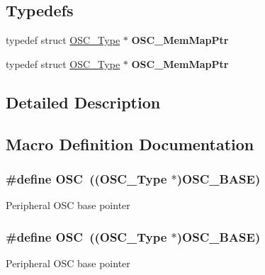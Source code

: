 \subsection*{Typedefs}
\begin{DoxyCompactItemize}
\item 
typedef struct \hyperlink{structOSC__Type}{O\+S\+C\+\_\+\+Type} $\ast$ {\bfseries O\+S\+C\+\_\+\+Mem\+Map\+Ptr}\hypertarget{group__OSC__Peripheral__Access__Layer_ga7c20b064e45e380ca2a66cb8322f4e94}{}\label{group__OSC__Peripheral__Access__Layer_ga7c20b064e45e380ca2a66cb8322f4e94}

\item 
typedef struct \hyperlink{structOSC__Type}{O\+S\+C\+\_\+\+Type} $\ast$ {\bfseries O\+S\+C\+\_\+\+Mem\+Map\+Ptr}\hypertarget{group__OSC__Peripheral__Access__Layer_ga7c20b064e45e380ca2a66cb8322f4e94}{}\label{group__OSC__Peripheral__Access__Layer_ga7c20b064e45e380ca2a66cb8322f4e94}

\end{DoxyCompactItemize}


\subsection{Detailed Description}


\subsection{Macro Definition Documentation}
\subsubsection[{\texorpdfstring{O\+SC}{OSC}}]{\setlength{\rightskip}{0pt plus 5cm}\#define O\+SC~(({\bf O\+S\+C\+\_\+\+Type} $\ast$){\bf O\+S\+C\+\_\+\+B\+A\+SE})}\hypertarget{group__OSC__Peripheral__Access__Layer_gac9fd21467d416baa7f6aa4c175f8c6b5}{}\label{group__OSC__Peripheral__Access__Layer_gac9fd21467d416baa7f6aa4c175f8c6b5}
Peripheral O\+SC base pointer 
\subsubsection[{\texorpdfstring{O\+SC}{OSC}}]{\setlength{\rightskip}{0pt plus 5cm}\#define O\+SC~(({\bf O\+S\+C\+\_\+\+Type} $\ast$){\bf O\+S\+C\+\_\+\+B\+A\+SE})}\hypertarget{group__OSC__Peripheral__Access__Layer_gac9fd21467d416baa7f6aa4c175f8c6b5}{}\label{group__OSC__Peripheral__Access__Layer_gac9fd21467d416baa7f6aa4c175f8c6b5}
Peripheral O\+SC base pointer 
